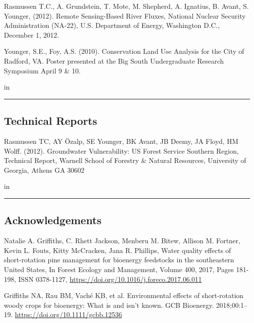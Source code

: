 \documentclass[10pt,letterpaper]{article}
\begin{document}
\begin{hangparas}{.25in}{1}
	Rasmussen T.C., A. Grundstein, T. Mote, M. Shepherd, A. Ignatius, B. Avant, S. Younger, (2012). Remote Sensing-Based River Fluxes, National Nuclear Security Administration (NA-22), U.S. Department of Energy, Washington D.C., December 1, 2012.
	
	Younger, S.E., Foy, A.S. (2010). Conservation Land Use Analysis for the City of Radford, VA. Poster presented at the Big South Undergraduate Research Symposium April 9 \& 10.
	
\end{hangparas}

 in

\hrule
\vspace{-0.4em}
\vskip 0.2in
\subsection*{Technical Reports}

\begin{hangparas}{.25in}{1}
	
	Rasmussen TC, AY \"{O}zalp, SE Younger, BK Avant, JB Deemy, JA Floyd, HM Wolff. (2012). Groundwater Vulnerability: US Forest Service Southern Region, Technical Report, Warnell School of Forestry \& Natural Resources, University of Georgia, Athens GA 30602
	
\end{hangparas}

 in

\hrule
\vspace{-0.4em}
\vskip 0.2in
\subsection*{Acknowledgements}
	
	\begin{hangparas}{.25in}{1}
		
	Natalie A. Griffiths, C. Rhett Jackson, Menberu M. Bitew, Allison M. Fortner, Kevin L. Fouts, Kitty McCracken, Jana R. Phillips, Water quality effects of short-rotation pine management for bioenergy feedstocks in the southeastern United States, In Forest Ecology and Management, Volume 400, 2017, Pages 181-198, ISSN 0378-1127, \url{https://doi.org/10.1016/j.foreco.2017.06.011}
	
	Griffiths NA, Rau BM, Vaché KB, et al. Environmental effects of short‐rotation woody crops for bioenergy: What is and isn’t known. GCB Bioenergy. 2018;00:1–19. \url{https://doi.org/10.1111/gcbb.12536}
	
	\end{hangparas}
\end{document}
